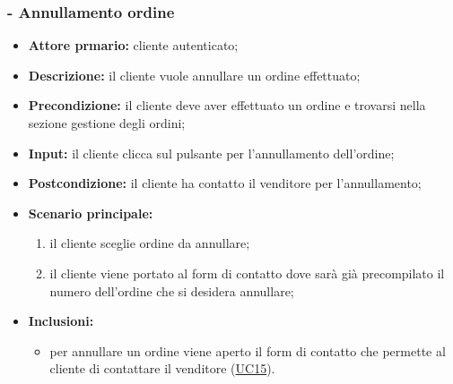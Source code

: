 \subsubsection{ - Annullamento ordine}
\begin{itemize}
    \item \textbf{Attore prmario:} cliente autenticato;
    \item \textbf{Descrizione:} il cliente vuole annullare un ordine effettuato;
    \item \textbf{Precondizione:} il cliente deve aver effettuato un ordine e trovarsi nella sezione gestione degli ordini;
    \item \textbf{Input:} il cliente clicca sul pulsante per l'annullamento dell'ordine;
    \item \textbf{Postcondizione:} il cliente ha contatto il venditore per l'annullamento;
    \item \textbf{Scenario principale:}
          \begin{enumerate}
              \item il cliente sceglie ordine da annullare;
              \item il cliente viene portato al form di contatto dove sarà già precompilato il numero dell'ordine che si desidera annullare;
          \end{enumerate}
    \item \textbf{Inclusioni:}
          \begin{itemize}
              \item per annullare un ordine viene aperto il form di contatto che permette al cliente di contattare il venditore (\hyperref[UC15]{UC15}).
          \end{itemize}
\end{itemize}

\stepsubUserCase
